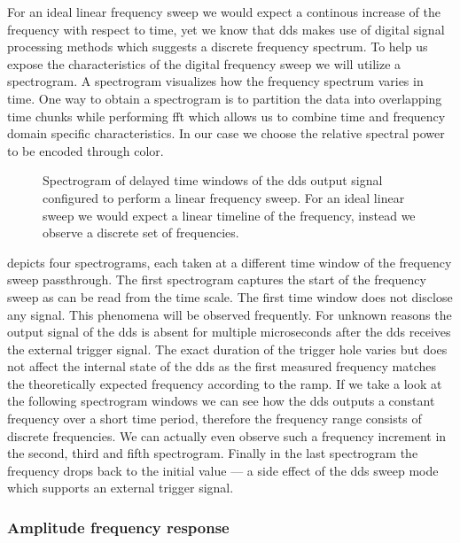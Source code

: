 For an ideal linear frequency sweep we would expect a continous increase of
the frequency with respect to time, yet we know that \gls{dds} makes use of
digital signal processing methods which suggests a discrete frequency
spectrum. To help us expose the characteristics of the digital frequency
sweep we will utilize a spectrogram. A spectrogram visualizes how the
frequency spectrum varies in time. One way to obtain a spectrogram is to
partition the data into overlapping time chunks while performing \gls{fft}
which allows us to combine time and frequency domain specific
characteristics. In our case we choose the relative spectral power to be
encoded through color.
\begin{figure}[htb]
  \centering
  \begin{adjustbox}{width=\textwidth}
  \end{adjustbox}
  \caption{Spectrogram of delayed time windows of the \gls{dds} output signal
    configured to perform a linear frequency sweep. For an ideal linear sweep
    we would expect a linear timeline of the frequency, instead we observe a
    discrete set of frequencies.
  }\label{fig:signal_synthesis_spectrogram}
\end{figure}
 depicts four spectrograms, each taken
at a different time window of the frequency sweep passthrough. The first
spectrogram captures the start of the frequency sweep as can be read from
the time scale. The first time window does not disclose any signal. This
phenomena will be observed frequently. For unknown reasons the output signal
of the \gls{dds} is absent for multiple microseconds after the \gls{dds}
receives the external trigger signal. The exact duration of the trigger hole
varies but does not affect the internal state of the \gls{dds} as the first
measured frequency matches the theoretically expected frequency according to
the ramp. If we take a look at the following spectrogram windows we can see
how the \gls{dds} outputs a constant frequency over a short time period,
therefore the frequency range consists of discrete frequencies. We can
actually even observe such a frequency increment in the second, third and
fifth spectrogram. Finally in the last spectrogram the frequency drops back
to the initial value --- a side effect of the \gls{dds} sweep mode which
supports an external trigger signal.

\subsubsection{Amplitude frequency response}

